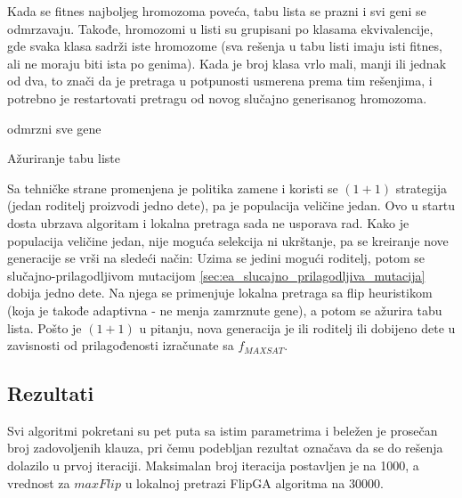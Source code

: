 \documentclass[a4paper]{article}
\begin{document}
Kada se fitnes najboljeg hromozoma poveća, tabu lista se prazni i svi geni se odmrzavaju.
Takođe, hromozomi u listi su grupisani po klasama ekvivalencije, gde svaka klasa sadrži
iste hromozome (sva rešenja u tabu listi imaju isti fitnes, 
ali ne moraju biti ista po genima). Kada je broj klasa vrlo mali, manji ili jednak od dva,
to znači da je pretraga u potpunosti usmerena prema tim rešenjima, i potrebno je restartovati
pretragu od novog slučajno generisanog hromozoma. \\

\begin{algorithm}[H]
\SetAlgoLined
{}

\BlankLine
 odmrzni sve gene\;
 \caption{Ažuriranje tabu liste}
\end{algorithm}

Sa tehničke strane promenjena je politika zamene i koristi se $(1+1)$ strategija 
(jedan roditelj proizvodi jedno dete), pa je populacija veličine jedan. Ovo u startu dosta
ubrzava algoritam i lokalna pretraga sada ne usporava rad.
Kako je populacija veličine jedan, nije moguća selekcija ni ukrštanje, 
pa se kreiranje nove generacije se vrši na sledeći način: 
Uzima se jedini mogući roditelj, potom se slučajno-prilagodljivom mutacijom
\ref{sec:ea_slucajno_prilagodljiva_mutacija} dobija jedno dete. 
Na njega se primenjuje lokalna pretraga sa flip heuristikom (koja je takođe adaptivna - 
ne menja zamrznute gene), a potom se ažurira tabu lista.
Pošto je $(1+1)$ u pitanju, nova generacija je ili roditelj ili dobijeno dete 
u zavisnosti od prilagođenosti izračunate sa $f_{MAXSAT}$.



\subsection{Rezultati}
\label{sec:ea_rezultati}
Svi algoritmi pokretani su pet puta sa istim parametrima i beležen je prosečan broj
zadovoljenih klauza, pri čemu podebljan rezultat označava da se do rešenja 
dolazilo u prvoj iteraciji. Maksimalan broj iteracija postavljen je na 1000, a vrednost
za $maxFlip$ u lokalnoj pretrazi FlipGA algoritma na 30000.\\
\end{document}
